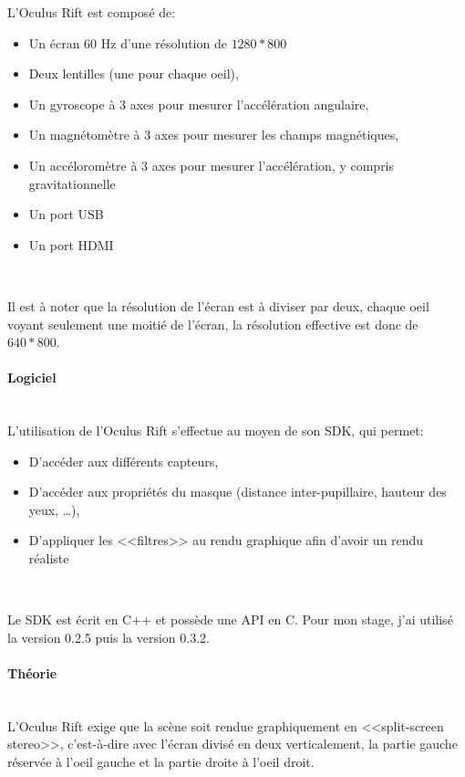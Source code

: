 \documentclass[a4paper,french,12pt]{article}
\begin{document}
				L'Oculus Rift est composé de:\\

				\begin{itemize}
				\item Un écran 60 Hz d'une résolution de $1280*800$
				\item Deux lentilles (une pour chaque oeil),
				\item Un gyroscope à 3 axes pour mesurer l'accélération angulaire,
				\item Un magnétomètre à 3 axes pour mesurer les champs magnétiques,
				\item Un accéloromètre à 3 axes pour mesurer l'accélération, y compris gravitationnelle
				\item Un port USB
				\item Un port HDMI
				\end{itemize} ~

				Il est à noter que la résolution de l'écran est à diviser par deux, chaque oeil voyant seulement
				une moitié de l'écran, la résolution effective est donc de $640*800$.

			\paragraph{Logiciel} ~\\

			    L'utilisation de l'Oculus Rift s'effectue au moyen de son SDK, qui permet:\\

			    \begin{itemize}
			    \item D'accéder aux différents capteurs,
			    \item D'accéder aux propriétés du masque (distance inter-pupillaire, hauteur des yeux, \ldots),
			    \item D'appliquer les <<filtres>> au rendu graphique afin d'avoir un rendu réaliste
			    \end{itemize} ~

			    Le SDK est écrit en C++ et possède une API en C.
			    Pour mon stage, j'ai utilisé la version 0.2.5 puis la version 0.3.2.

			\paragraph{Théorie} ~\\

			    L'Oculus Rift exige que la scène soit rendue graphiquement en <<split-screen stereo>>,
			    c'est-à-dire avec l'écran divisé en deux verticalement, la partie gauche réservée à l'oeil gauche
			    et la partie droite à l'oeil droit.
\end{document}
